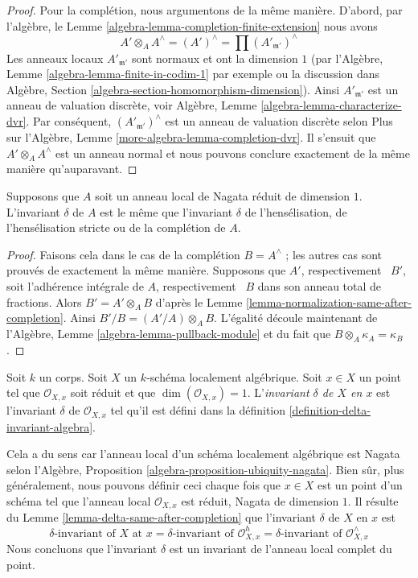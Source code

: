 \begin{proof}
\medskip\noindent
Pour la complétion, nous argumentons de la même manière. D'abord, par
l'algèbre, le Lemme \ref{algebra-lemma-completion-finite-extension} nous avons
$$
A' \otimes_A A^\wedge = (A')^\wedge =
\prod\nolimits (A'_{\mathfrak m'})^\wedge
$$
Les anneaux locaux $A'_{\mathfrak m'}$ sont normaux et ont la
dimension $1$ (par l'Algèbre, Lemme
\ref{algebra-lemma-finite-in-codim-1} par exemple ou la discussion
dans Algèbre, Section
\ref{algebra-section-homomorphism-dimension}). Ainsi $A'_{\mathfrak m'}$
est un anneau de valuation discrète, voir Algèbre, Lemme
\ref{algebra-lemma-characterize-dvr}. Par conséquent, $(A'_{\mathfrak
m'})^\wedge$ est un anneau de valuation discrète selon Plus sur l'Algèbre, Lemme
\ref{more-algebra-lemma-completion-dvr}. Il s'ensuit que $A' \otimes_A A^\wedge$ est
un anneau normal et nous pouvons conclure exactement de la même manière qu'auparavant.
\end{proof}

\begin{lemma}
\label{lemma-delta-same-after-completion}
Supposons que $A$ soit un anneau local de Nagata
réduit de dimension $1$. L'invariant $\delta$ de $A$
est le même que l'invariant $\delta$ de l'hensélisation,
de l'hensélisation stricte ou de la complétion de $A$.
\end{lemma}

\begin{proof}
Faisons cela dans le cas de la complétion $B =
A^\wedge$ ; les autres cas sont prouvés de
exactement la même manière. Supposons que $A'$,
respectivement \ $B'$, soit l'adhérence intégrale de
$A$, respectivement \ $B$ dans son anneau total de
fractions. Alors $B' = A' \otimes_A B$ d'après le Lemme
\ref{lemma-normalization-same-after-completion}. Ainsi
$B'/B = (A'/A) \otimes_A B$. L'égalité découle
maintenant de l'Algèbre, Lemme
\ref{algebra-lemma-pullback-module} et du fait que $B \otimes_A \kappa_A = \kappa_B$.
\end{proof}

\begin{definition}
\label{definition-delta-invariant}
Soit $k$ un corps. Soit $X$ un $k$-schéma localement
algébrique. Soit $x \in X$ un point tel que
$\mathcal{O}_{X, x}$ soit réduit et que $\dim(\mathcal{O}_{X,
x}) = 1$. L'{\it invariant $\delta$ de $X$ en $x$ } est
l'invariant $\delta$ de $\mathcal{O}_{X, x}$ tel qu'il est
défini dans la définition \ref{definition-delta-invariant-algebra}.
\end{definition}

\noindent
Cela a du sens car l'anneau local d'un schéma
localement algébrique est Nagata selon l'Algèbre,
Proposition \ref{algebra-proposition-ubiquity-nagata}.
Bien sûr, plus généralement, nous pouvons définir ceci
chaque fois que $x \in X$ est un point d'un schéma tel que
l'anneau local $\mathcal{O}_{X, x}$ est réduit, Nagata de
dimension $1$. Il résulte du Lemme
\ref{lemma-delta-same-after-completion} que l'invariant $\delta$ de $X$ en $x$ est
$$
\delta\text{-invariant of }X\text{ at }x =
\delta\text{-invariant of }\mathcal{O}_{X, x}^h =
\delta\text{-invariant of }\mathcal{O}_{X, x}^\wedge
$$
Nous concluons que l'invariant $\delta$ est un
invariant de l'anneau local complet du point.


